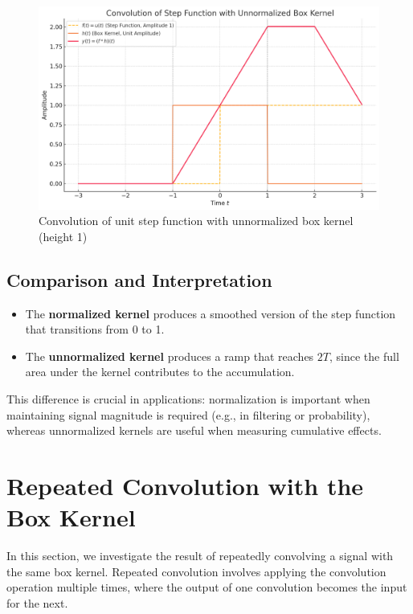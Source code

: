 \documentclass{article}
\begin{document}
\begin{figure}[H]
    \centering
    \includegraphics[width=1\linewidth]{figs/unnormalized_box.png}
\caption{Convolution of unit step function with unnormalized box kernel (height 1)}
\end{figure}

\subsection{Comparison and Interpretation}

\begin{itemize}
    \item The \textbf{normalized kernel} produces a smoothed version of the step function that transitions from 0 to 1.
    \item The \textbf{unnormalized kernel} produces a ramp that reaches \(2T\), since the full area under the kernel contributes to the accumulation.
\end{itemize}

This difference is crucial in applications: normalization is important when maintaining signal magnitude is required (e.g., in filtering or probability), whereas unnormalized kernels are useful when measuring cumulative effects.

\section{Repeated Convolution with the Box Kernel}

In this section, we investigate the result of repeatedly convolving a signal with the same box kernel. Repeated convolution involves applying the convolution operation multiple times, where the output of one convolution becomes the input for the next.
\end{document}
